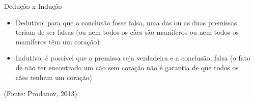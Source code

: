\documentclass{beamer}
\begin{document}
\begin{frame}{Dedução x Indução}
  \begin{itemize}
  \item Dedutivo: para que a conclusão fosse falsa, uma das ou as duas
    premissas teriam de ser falsas (ou nem todos os cães são mamíferos
    ou nem todos os mamíferos têm um coração)
  \item Indutivo: é possível que a premissa seja verdadeira e a
    conclusão, falsa (o fato de não ter encontrado um cão sem coração
    não é garantia de que todos os cães tenham um coração)
  \end{itemize}

\vfill
(Fonte: Prodanov, 2013)
\end{frame}



\end{document}
